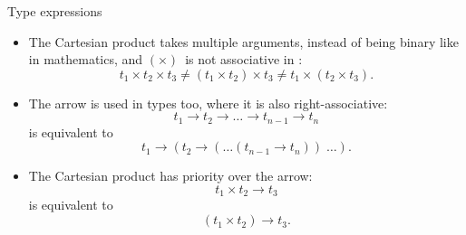 %
\begin{frame}{Type expressions}

  \begin{itemize}

    \item The Cartesian product takes multiple arguments, instead of
      being binary like in mathematics, and $(\times)$~is not
      associative in \OCaml:
      \begin{equation*}
        t_1 \times t_2 \times t_3 \neq (t_1 \times t_2) \times
        t_3 \neq t_1 \times (t_2 \times t_3).
      \end{equation*}

    \item The arrow is used in types too, where it is also
      right\hyp{}associative:
      \begin{equation*}
        t_1 \rightarrow t_2 \rightarrow \ldots
        \rightarrow t_{n-1} \rightarrow t_n
      \end{equation*}
      is equivalent to
      \begin{equation*}
        t_1 \rightarrow (t_2 \rightarrow (\ldots
        (t_{n-1} \rightarrow t_n)) \; \ldots).
      \end{equation*}

    \item The Cartesian product has priority over the arrow:
      \begin{equation*}
        t_1 \times t_2 \rightarrow t_3
      \end{equation*}
      is equivalent to
      \begin{equation*}
        (t_1 \times t_2) \rightarrow t_3.
      \end{equation*}

  \end{itemize}

\end{frame}

